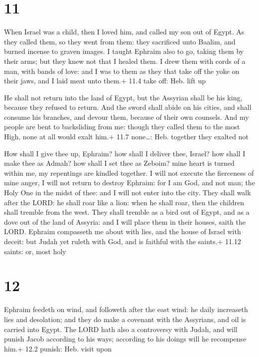 \hypertarget{section-10}{%
\section{11}\label{section-10}}

 When Israel was a child, then I loved him, and called my
son out of Egypt.  As they called them, so they went from
them: they sacrificed unto Baalim, and burned incense to graven images.
 I taught Ephraim also to go, taking them by their arms; but
they knew not that I healed them.  I drew them with cords of
a man, with bands of love: and I was to them as they that take off the
yoke on their jaws, and I laid meat unto them.+ 11.4 take off: Heb. lift
up

 He shall not return into the land of Egypt, but the
Assyrian shall be his king, because they refused to return. 
And the sword shall abide on his cities, and shall consume his branches,
and devour them, because of their own counsels.  And my
people are bent to backsliding from me: though they called them to the
most High, none at all would exalt him.+ 11.7 none\ldots: Heb. together
they exalted not

 How shall I give thee up, Ephraim? how shall I deliver
thee, Israel? how shall I make thee as Admah? how shall I set thee as
Zeboim? mine heart is turned within me, my repentings are kindled
together.  I will not execute the fierceness of mine anger,
I will not return to destroy Ephraim: for I am God, and not man; the
Holy One in the midst of thee: and I will not enter into the city.
 They shall walk after the LORD: he shall roar like a lion:
when he shall roar, then the children shall tremble from the west.
 They shall tremble as a bird out of Egypt, and as a dove
out of the land of Assyria: and I will place them in their houses, saith
the LORD.  Ephraim compasseth me about with lies, and the
house of Israel with deceit: but Judah yet ruleth with God, and is
faithful with the saints.+ 11.12 saints: or, most holy

\hypertarget{section-11}{%
\section{12}\label{section-11}}

 Ephraim feedeth on wind, and followeth after the east wind:
he daily increaseth lies and desolation; and they do make a covenant
with the Assyrians, and oil is carried into Egypt.  The LORD
hath also a controversy with Judah, and will punish Jacob according to
his ways; according to his doings will he recompense him.+ 12.2 punish:
Heb. visit upon

